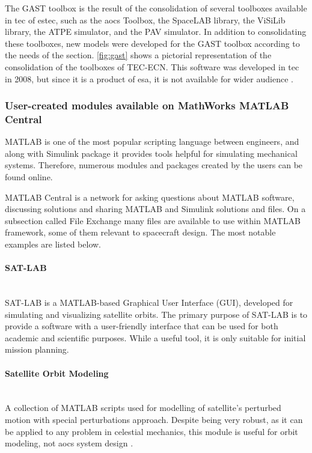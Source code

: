         The GAST toolbox is the result of the consolidation of several toolboxes available in \ac{tec} of \ac{estec}, such as the \ac{aocs} Toolbox, the SpaceLAB library, the ViSiLib library, the ATPE simulator, and the PAV simulator. In addition to consolidating these toolboxes, new models were developed for the GAST toolbox according to the needs of the section. \autoref{fig:gast} shows a pictorial representation of the consolidation of the toolboxes of TEC-ECN. This software was developed in \ac{tec} in 2008, but since it is a product of \ac{esa}, it is not available for wider audience \cite{gast}.

    \vfill
    \subsubsection{User-created modules available on MathWorks MATLAB Central}
    MATLAB is one of the most popular scripting language between engineers, and along with Simulink package it provides tools helpful for simulating mechanical systems. Therefore, numerous modules and packages created by the users can be found online.
    
    MATLAB Central is a network for asking questions about MATLAB software, discussing solutions and sharing MATLAB and Simulink solutions and files\cite{matlabcentral}. On a subsection called File Exchange many files are available to use within MATLAB framework, some of them relevant to spacecraft design. The most notable examples are listed below.
    \clearpage

        \paragraph*{SAT-LAB}\hspace{0pt}\\[0.1cm]
            SAT-LAB is a MATLAB-based Graphical User Interface (GUI), developed for simulating and visualizing satellite orbits. The primary purpose of SAT-LAB is to provide a software with a user-friendly interface that can be used for both academic and scientific purposes. While a useful tool, it is only suitable for initial mission planning\cite{satlab}.

        \paragraph*{Satellite Orbit Modeling}\hspace{0pt}\\[0.1cm]
            A collection of MATLAB scripts used for modelling of satellite's perturbed motion with special perturbations approach. Despite being very robust, as it can be applied to any problem in celestial mechanics, this module is useful for orbit modeling, not \ac{aocs} system design \cite{som-matlab}.
            

